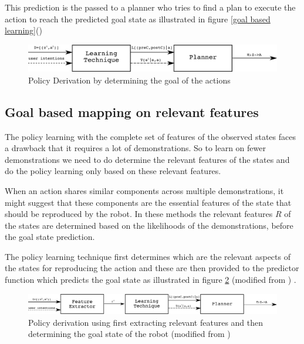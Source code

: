 This prediction is the passed to a planner who tries to find a plan to execute
the action to reach the predicted goal state as illustrated in figure \ref{goal
based learning}(\cite{argall_survey_2009})
\begin{figure}[htp]
\centering
\includegraphics[scale=0.8]{images/plans_policy_derivation.png}
\caption[Deriving a policy : goal based]{Policy Derivation by determining the
goal of the actions \cite{argall_survey_2009}}
\label{goal based learning}
\end{figure}
\subsection {Goal based mapping on relevant features}

The policy learning with the complete set of features of the observed states
faces a drawback that it requires a lot of demonstrations. So to learn on fewer
demonstrations we need to do determine the relevant features of the states and
do the policy learning only based on these relevant features.

When an action shares similar components across multiple demonstrations, it
might suggest that these components are the essential features of the state
that should be reproduced by the robot. In these methods the relevant features
$R$ of the states are determined based on the likelihoods of the
demonstrations, before the goal state prediction.

The policy learning technique first determines which are the relevant aspects
of the states for reproducing the action and these are then provided to the
predictor function which predicts the goal state as illustrated in figure
\ref{feature goal based learning} (modified from \cite{argall_survey_2009}) .

\begin{figure}[htp]
\centering
\includegraphics[scale=0.6]{images/features_plans_policy_derivation.png}
\caption[Deriving a policy : feature based ]{Policy derivation using first
extracting relevant features and then determining the goal state of the robot
(modified from \cite{argall_survey_2009})}
\label{feature goal based learning}
\end{figure}

